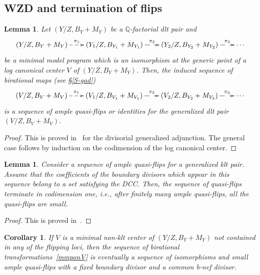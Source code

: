 \documentclass{amsart}
\renewcommand{\qq}{\mathbb{Q}}
\newtheorem{lemma}[theorem]{Lemma}
\newtheorem{corollary}[theorem]{Corollary}
\theoremstyle{remark}
\numberwithin{equation}{section}
\begin{document}
\subsection{WZD and termination of flips}

\begin{lemma}\label{mmplcc}
Let $(Y/Z, B_Y+M_Y)$ be a $\qq$-factorial dlt pair and 
\[
 \xymatrix@C=2em{
(Y/Z,B_Y+M_Y)\ar@{-->}[r]^-{\pi_1} & (Y_1/Z,B_{Y_1}+M_{Y_1})\ar@{-->}[r]^-{\pi_2} & (Y_2/Z,B_{Y_2}+M_{Y_2}) \ar@{-->}[r]^-{\pi_3} & 
\cdots 
 }
\]
be a minimal model program which is an isomorphism at the generic point of a log canonical center $V$ of $(Y/Z,B_Y+M_Y)$.
Then, the induced sequence of birational maps (see \S \ref{S-gad})
\begin{equation}\label{mmponV}
 \xymatrix@C=2em{
(V/Z,B_V+M_V)\ar@{-->}[r]^-{\pi_1} & (V_1/Z,B_{V_1}+M_{V_1})\ar@{-->}[r]^-{\pi_2} & (V_2/Z,B_{V_2}+M_{V_2}) \ar@{-->}[r]^-{\pi_3} & 
\cdots 
 }
\end{equation}
is a sequence of ample quasi-flips or identities for the generalized dlt pair $(V/Z,B_V+M_V)$.
\end{lemma}

\begin{proof}
This is proved in~\cite[Proposition 4.3]{Mor18} for the divisorial generalized adjunction.
The general case follows by induction on the codimension of the log canonical center.
\end{proof}

\begin{lemma}\label{tercod1}
Consider a sequence of ample quasi-flips for a generalized klt pair.
Assume that the coefficients of the boundary divisors which appear
in this sequence belong to a set satisfying the DCC.
Then, the sequence of quasi-flips terminate in codimension one, i.e.,
after finitely many ample quasi-flips, all the quasi-flips are small.
\end{lemma}

\begin{proof}
This is proved in~\cite[Lemma 4.26]{Mor18}.
\end{proof}

\begin{corollary}\label{small}
If $V$ is a minimal non-klt center of $(Y/Z,B_Y+M_Y)$ not contained in any of the flipping loci, then 
the sequence of birational transformations~\eqref{mmponV} is eventually a sequence of isomorphisms and small ample quasi-flips
with a fixed boundary divisor and a common b-nef divisor.
\end{corollary}
\end{document}
